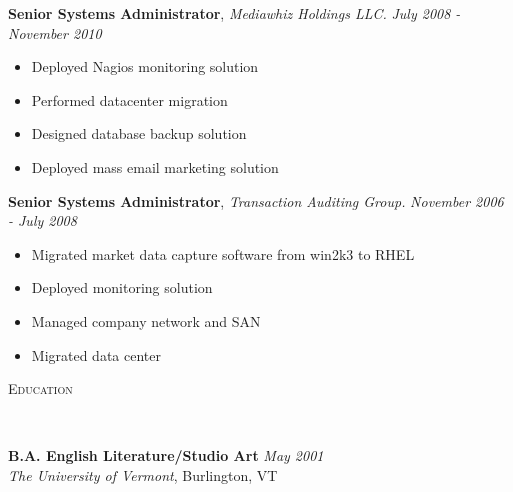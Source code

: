 \documentclass[9pt]{article}
\newenvironment{changemargin}[2]{%
  \begin{list}{}{%
    \setlength{\topsep}{0pt}%
    \setlength{\leftmargin}{#1}%
    \setlength{\rightmargin}{#2}%
    \setlength{\listparindent}{\parindent}%
    \setlength{\itemindent}{\parindent}%
    \setlength{\parsep}{\parskip}%
  }%
  \item[]}{\end{list}
}
\newcommand{\lineover}{
	\begin{changemargin}{-0.05in}{-0.05in}
		\vspace*{-8pt}
		\hrulefill \\
		\vspace*{-2pt}
	\end{changemargin}
}
\newcommand{\header}[1]{
	\begin{changemargin}{-0.5in}{-0.5in}
		\scshape{#1}\\
  	\lineover
	\end{changemargin}
}
\newenvironment{body} {
	\vspace*{-16pt}
	\begin{changemargin}{-0.25in}{-0.5in}
  }
	{\end{changemargin}
}
\begin{document}
\begin{body}
	\textbf {Senior Systems Administrator}, \emph{Mediawhiz Holdings LLC.} \hfill \emph{July 2008 - November 2010}\\
	\vspace*{-4pt}
	\begin{itemize} \itemsep -0pt %
		\item Deployed Nagios monitoring solution
		\item Performed datacenter migration
		\item Designed database backup solution
		\item Deployed mass email marketing solution
	\end{itemize}

\textbf {Senior Systems Administrator}, \emph{Transaction Auditing Group.} \hfill \emph{November 2006 - July 2008}\\
	\vspace*{-4pt}
	\begin{itemize} \itemsep -0pt %
		\item Migrated market data capture software from win2k3 to RHEL
		\item Deployed monitoring solution
		\item Managed company network and SAN
		\item Migrated data center
	\end{itemize}
\end{body}

\smallskip

\header{Education}

\begin{body}
	\vspace{14pt}
	\textbf{B.A. English Literature/Studio Art}{} \hfill \emph{May 2001}{} \\
	\emph{The University of Vermont}, Burlington, VT{} \\
\end{body}
\end{document}
